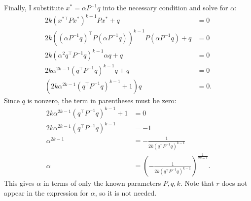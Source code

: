 \begin{homeworkProblem}
\begin{solution}
        Finally, I substitute $x^* = \alpha P^{-1} q$ into the necessary condition and
        solve for $\alpha$:
        \begin{align*}
            2 k (x^{*\top} P x^*)^{k-1} P x^* + q &= 0 \\
            2 k ((\alpha P^{-   1} q)^\top P (\alpha P^{-1} q))^{k-1} P (\alpha P^{-1} q) + q &= 0 \\
            2 k (\alpha^2 q^\top P^{-1} q)^{k-1} \alpha q + q &= 0 \\
            2 k \alpha^{2k - 1} (q^\top P^{-1} q)^{k-1} q + q &= 0 \\
            (2 k \alpha^{2k - 1} (q^\top P^{-1} q)^{k-1} + 1) q &= 0.
        \end{align*}
        Since $q$ is nonzero, the term in parentheses must be zero:
        \begin{align*}
            2 k \alpha^{2k - 1} (q^\top P^{-1} q)^{k-1} + 1 &= 0 \\
            2 k \alpha^{2k - 1} (q^\top P^{-1} q)^{k-1} &= -1 \\
            \alpha^{2k - 1} &= -\frac{1}{2 k (q^\top P^{-1} q)^{k-1}} \\
            \alpha &= \left( -\frac{1}{2 k (q^\top P^{-1} q)^{k-1}} \right)^{\frac{1}{2k - 1}}.
        \end{align*}
        This gives $\alpha$ in terms of only the known parameters $P, q, k$. Note that
        $r$ does not appear in the expression for $\alpha$, so it is not needed.

    \end{solution}

\end{homeworkProblem}